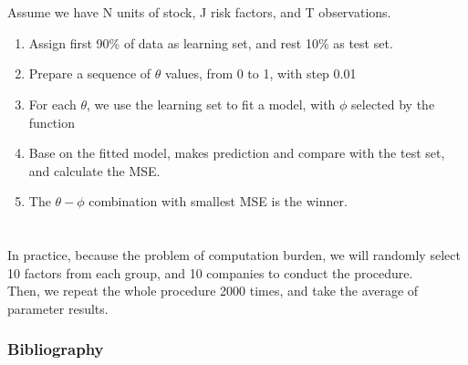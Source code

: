 \documentclass[12pt]{beamer}
\begin{document}
	\section*{}
\begin{frame}
Assume we have N units of stock, J risk factors, and T observations.\\
\begin{enumerate}
\item Assign first 90\% of data as learning set, and rest 10\% as test set.
\item Prepare a sequence of $\theta$ values, from 0 to 1, with step 0.01
\item For each $\theta$, we use the learning set to fit a model, with $\phi$ selected by the function
\item Base on the fitted model, makes prediction and compare with the test set, and calculate the MSE.
\item The $\theta-\phi$ combination with smallest MSE is the winner.
\end{enumerate}
\end{frame}

	\section*{}
\begin{frame}
In practice, because the problem of computation burden, we will randomly select 10 factors from each group, and 10 companies to conduct the procedure.\\
Then, we repeat the whole procedure 2000 times, and take the average of parameter results.\\ 
\end{frame}

\begin{frame}[allowframebreaks]
	\frametitle{Bibliography}
	
{\footnotesize}
\end{frame}
\end{document}
